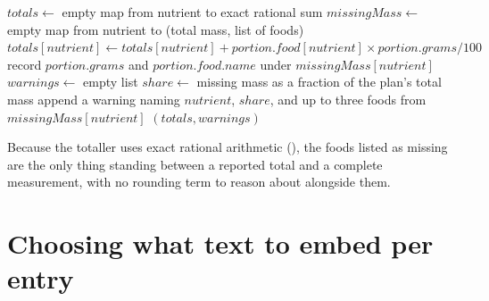 \begin{algorithm}[htbp]
\caption{Coverage-aware nutrient total with per-nutrient warnings.}
\label{alg:coverage}
\begin{algorithmic}[1]
    \State $\mathit{totals} \gets$ empty map from nutrient to exact rational sum
    \State $\mathit{missingMass} \gets$ empty map from nutrient to (total mass, list of foods)
                \State $\mathit{totals}[\mathit{nutrient}] \gets \mathit{totals}[\mathit{nutrient}] + \mathit{portion}.\mathit{food}[\mathit{nutrient}] \times \mathit{portion}.\mathit{grams} / 100$
            \Else
                \State record $\mathit{portion}.\mathit{grams}$ and $\mathit{portion}.\mathit{food}.\mathit{name}$ under $\mathit{missingMass}[\mathit{nutrient}]$
            \EndIf
        \EndFor
    \EndFor
    \State $\mathit{warnings} \gets$ empty list
        \State $\mathit{share} \gets$ missing mass as a fraction of the plan's total mass
        \State append a warning naming $\mathit{nutrient}$, $\mathit{share}$, and up to three foods from $\mathit{missingMass}[\mathit{nutrient}]$
    \EndFor
    \State \Return $(\mathit{totals}, \mathit{warnings})$
\EndFunction
\end{algorithmic}
\end{algorithm}

Because the totaller uses exact rational arithmetic (), the foods listed as missing are the only thing standing between a reported total and a complete measurement, with no rounding term to reason about alongside them.

\section{Choosing what text to embed per entry}
\label{sec:impl-hybrid-search}

